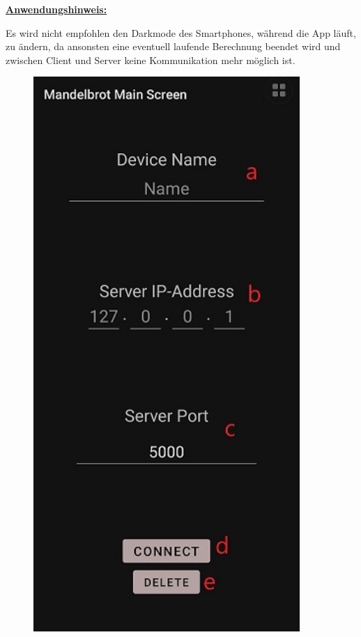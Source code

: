 \documentclass[12pt, onecolumn, notitlepage]{scrartcl}
\begin{document}
\underline{\textbf{Anwendungshinweis:}} \par
Es wird nicht empfohlen den Darkmode des Smartphones, während die App läuft, zu ändern, da ansonsten eine eventuell laufende Berechnung beendet wird und zwischen Client und Server keine Kommunikation mehr möglich ist.

\begin{figure}[H] 
	\begin{minipage}[b]{.4\linewidth}
		\centering
		\includegraphics[height=0.5\textheight, width=0.9\textwidth]{start_screen.jpg}

\end{minipage}
\end{figure}
\end{document}
